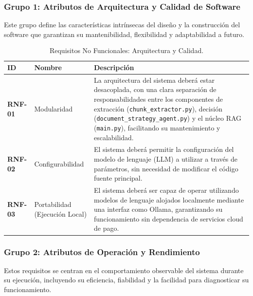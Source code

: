 \subsubsection*{Grupo 1: Atributos de Arquitectura y Calidad de Software}
Este grupo define las características intrínsecas del diseño y la construcción del software que garantizan su mantenibilidad, flexibilidad y adaptabilidad a futuro.

\begin{table}[H]
\centering
\renewcommand{\arraystretch}{1.4}
\caption{Requisitos No Funcionales: Arquitectura y Calidad.}
\label{tab:rnf_arquitectura}
\begin{tabularx}{\textwidth}{|l|l|X|}
\hline
\textbf{ID} & \textbf{Nombre} & \textbf{Descripción} \\
\hline
\textbf{RNF-01} & Modularidad & La arquitectura del sistema deberá estar desacoplada, con una clara separación de responsabilidades entre los componentes de extracción (\texttt{chunk\_extractor.py}), decisión (\texttt{document\_strategy\_agent.py}) y el núcleo RAG (\texttt{main.py}), facilitando su mantenimiento y escalabilidad. \\
\hline
\textbf{RNF-02} & Configurabilidad & El sistema deberá permitir la configuración del modelo de lenguaje (LLM) a utilizar a través de parámetros, sin necesidad de modificar el código fuente principal. \\
\hline
\textbf{RNF-03} & Portabilidad (Ejecución Local) & El sistema deberá ser capaz de operar utilizando modelos de lenguaje alojados localmente mediante una interfaz como Ollama, garantizando su funcionamiento sin dependencia de servicios cloud de pago. \\
\hline
\end{tabularx}
\end{table}

\newpage
\subsubsection*{Grupo 2: Atributos de Operación y Rendimiento}
Estos requisitos se centran en el comportamiento observable del sistema durante su ejecución, incluyendo su eficiencia, fiabilidad y la facilidad para diagnosticar su funcionamiento.

